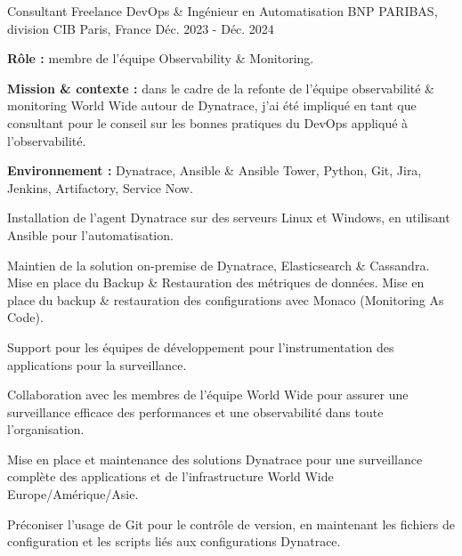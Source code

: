 
\begin{cventries}


\cventry
{Consultant Freelance DevOps \& Ingénieur en Automatisation} %
{BNP PARIBAS, division CIB} %
{Paris, France} %
{Déc. 2023 - Déc. 2024} %
{
  \begin{cvitems}
    \item {\textbf{Rôle :} membre de l'équipe Observability \& Monitoring.}
    \item {\textbf{Mission \& contexte :} dans le cadre de la refonte de l'équipe observabilité \& monitoring World Wide autour de Dynatrace, j'ai été impliqué en tant que consultant pour le conseil sur les bonnes pratiques du DevOps appliqué à l'observabilité.}
    \item {\textbf{Environnement :} Dynatrace, Ansible \& Ansible Tower, Python, Git, Jira, Jenkins, Artifactory, Service Now.}
    \item {Installation de l'agent Dynatrace sur des serveurs Linux et Windows, en utilisant Ansible pour l'automatisation.}
    \item {Maintien de la solution on-premise de Dynatrace, Elasticsearch \& Cassandra. Mise en place du Backup \& Restauration des métriques de données. Mise en place du backup \& restauration des configurations avec Monaco (Monitoring As Code).}
    \item {Support pour les équipes de développement pour l'instrumentation des applications pour la surveillance.}
    \item {Collaboration avec les membres de l'équipe World Wide pour assurer une surveillance efficace des performances et une observabilité dans toute l'organisation.}
    \item {Mise en place et maintenance des solutions Dynatrace pour une surveillance complète des applications et de l'infrastructure World Wide Europe/Amérique/Asie.}
    \item {Préconiser l'usage de Git pour le contrôle de version, en maintenant les fichiers de configuration et les scripts liés aux configurations Dynatrace.}

\end{cvitems}}
\end{cventries}
